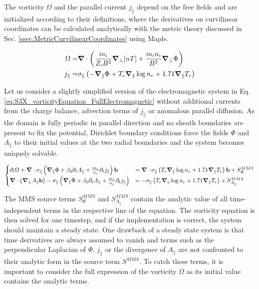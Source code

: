The vorticity $\Omega$ and the parallel current $j_\parallel$ depend on the free fields and are initialized according to their definitions, where the derivatives on curvilinear coordinates can be calculated analytically with the metric theory discussed in Sec. \ref{ssec:MetricCurvilinearCoordinates} using Maple. 

\begin{align}
	\Omega =& \grad\cdot\left(\frac{m_i}{Z_iB^2}\grad_\perp[nT] + \frac{m_in_i}{B^2}\grad_\perp\Phi\right) \\ 
	j_\parallel =& \sigma_\parallel \left(-\grad_\parallel\Phi + T_e\grad_\parallel\log n_e + 1.71\grad_\parallel T_e\right)
\end{align}

Let us consider a slightly simplified version of the electromagnetic system in Eq. \ref{eq:S3X_vorticityEquation_FullElectromagnetic} without additional currents from the charge balance, advection terms of $j_\parallel$ or anomalous parallel diffusion. As the domain is fully periodic in parallel direction and no sheath boundaries are present to fix the potential, Dirichlet boundary conditions force the fields $\Phi$ and $A_\parallel$ to their initial values at the two radial boundaries and the system becomes uniquely solvable. 

\begin{equation}
	\begin{cases}
		\partial_t\Omega + \grad\cdot\sigma_\parallel \left(\grad_\parallel\Phi + \beta_0\partial_t A_\parallel + \frac{m_e}{n_e}\partial_t j_\parallel\right)\mathbf{b} &= \grad\cdot\sigma_\parallel\left(T_e\grad_\parallel\log n_e + 1.71\grad_\parallel T_e\right)\mathbf{b} + S^{MMS}_\Phi \\
		\grad\cdot\left(\grad_\perp A_\parallel\mathbf{b}\right) - \sigma_\parallel \left( \grad_\parallel \Phi + \beta_0\partial_t A_\parallel + \frac{m_e}{n_e}\partial_t j_\parallel\right)&= -\sigma_\parallel\left(T_e\grad_\parallel\log n_e + 1.71\grad_\parallel T_e\right) + S^{MMS}_{A_\parallel}
	\end{cases}
	\label{eq:MMSTestSystem}
\end{equation}

The MMS source terms $S^{MMS}_\Phi$ and $S^{MMS}_{A_\parallel}$ contain the analytic value of all time-independent terms in the respective line of the equation. The vorticity equation is then solved for one timestep, and if the implementation is correct, the system should maintain a steady state. One drawback of a steady state system is that time derivatives are always assumed to vanish and terms such as the perpendicular Laplacian of $\Phi$, $j_\parallel$ or the divergence of $A_\parallel$ are not confronted to their analytic form in the source term $S^{MMS}$. To catch these terms, it is important to consider the full expression of the vorticity $\Omega$ as its initial value contains the analytic terms. \\

